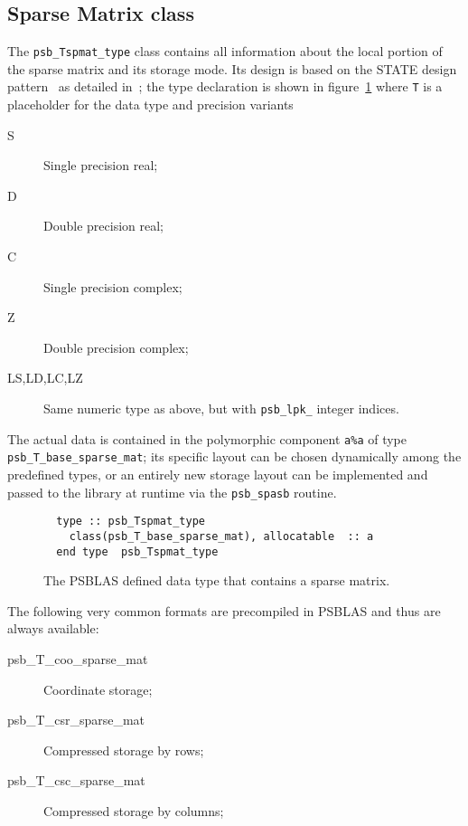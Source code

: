 \subsection{Sparse Matrix class}
\label{sec:spmat}
The \hypertarget{spdata}{{\tt psb\_Tspmat\_type}} class
contains all information about the local portion of the sparse matrix and   
its storage mode. Its design is 
based on the STATE design pattern~\cite{DesignPatterns} as detailed
in~\cite{Sparse03}; the type declaration is shown in
figure~\ref{fig:spmattype} where \verb|T| is a placeholder for the
data type and precision variants 
\begin{description}
\item[S] Single precision real;
\item[D] Double precision real;
\item[C] Single precision complex;
\item[Z] Double precision complex;
\item[LS,LD,LC,LZ] Same numeric type as above, but with
  \verb|psb_lpk_| integer indices.
\end{description}
The actual data is contained in the polymorphic component \verb|a%a|
of type  \hypertarget{spbasedata}{{\tt psb\_T\_base\_sparse\_mat}}; its
specific layout can be chosen dynamically among the predefined types,
or an entirely new storage layout can be implemented and passed to the
library at runtime via the \verb|psb_spasb| routine. 
\begin{figure}[h!]
\begin{center}
    \begin{minipage}[tl]{0.85\textwidth}
\begin{verbatim}
  type :: psb_Tspmat_type
    class(psb_T_base_sparse_mat), allocatable  :: a 
  end type  psb_Tspmat_type
\end{verbatim}
    \end{minipage}
  \end{center}
  \caption{\label{fig:spmattype} 
    The PSBLAS defined data type that
    contains a sparse matrix.} 
\end{figure}
The following very common formats are precompiled in  PSBLAS and thus
are always available: 
\begin{description}
\item[psb\_T\_coo\_sparse\_mat] Coordinate storage; 
\item[psb\_T\_csr\_sparse\_mat] Compressed storage by rows; 
\item[psb\_T\_csc\_sparse\_mat] Compressed storage by columns; 
\end{description}
